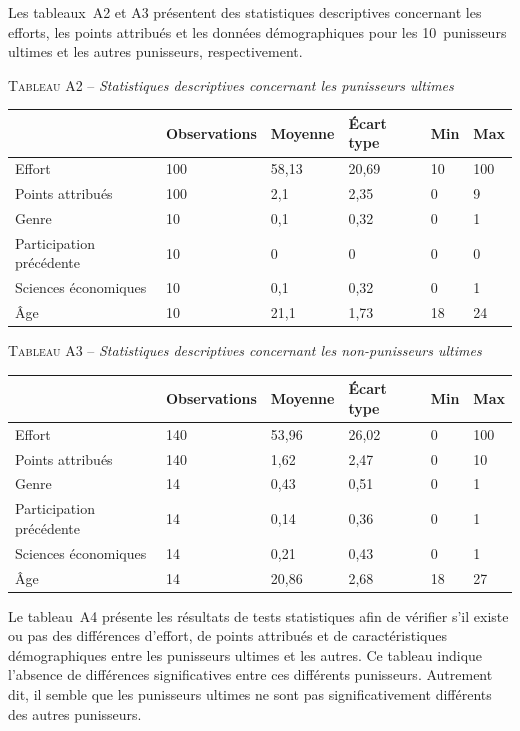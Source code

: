 \begin{Article}
\begin{refsection}[Lebourges]
\begin{appendices}
Les tableaux~A2 et A3 présentent des statistiques descriptives
concernant les efforts, les points attribués et les données
démographiques pour les 10~punisseurs ultimes et les autres punisseurs,
respectivement.

\vspace{0.2cm}
{\centering \textsc{Tableau A2} -- \emph{Statistiques descriptives concernant les punisseurs ultimes}\par}
\begin{table}[h!]
\label{tab_A2}
\centering
\begin{tabular}{p{2.8cm}D{1.2cm}D{1.2cm}D{1.2cm}D{1cm}D{1cm}}
\toprule
& Observations & Moyenne & Écart type & Min & Max \tabularnewline
\midrule
Effort & 100 & 58,13 & 20,69 & 10 & 100 \tabularnewline
Points attribués & 100 & 2,1 & 2,35 & 0 & 9 \tabularnewline
Genre & 10 & 0,1 & 0,32 & 0 & 1 \tabularnewline
Participation précédente & 10 & 0 & 0 & 0 & 0 \tabularnewline
Sciences économiques & 10 & 0,1 & 0,32 & 0 & 1 \tabularnewline
Âge & 10 & 21,1 & 1,73 & 18 & 24 \tabularnewline
\bottomrule
\end{tabular}
\end{table}

\vspace{0.2cm}
{\centering \textsc{Tableau A3} -- \emph{Statistiques descriptives concernant les non-punisseurs ultimes}\par}
\begin{table}[h!]
\label{tab_A3}
\centering
\begin{tabular}{p{2.8cm}D{1.2cm}D{1.2cm}D{1.2cm}D{1cm}D{1cm}}
\toprule
& Observations & Moyenne & Écart type & Min & Max \tabularnewline
\midrule
Effort & 140 & 53,96 & 26,02 & 0 & 100 \tabularnewline
Points attribués & 140 & 1,62 & 2,47 & 0 & 10 \tabularnewline
Genre & 14 & 0,43 & 0,51 & 0 & 1 \tabularnewline
Participation précédente & 14 & 0,14 & 0,36 & 0 & 1 \tabularnewline
Sciences économiques & 14 & 0,21 & 0,43 & 0 & 1 \tabularnewline
Âge & 14 & 20,86 & 2,68 & 18 & 27 \tabularnewline
\bottomrule
\end{tabular}
\end{table}

Le tableau~A4 présente les résultats de tests statistiques afin de
vérifier s'il existe ou pas des différences d'effort, de points
attribués et de caractéristiques démographiques entre les punisseurs
ultimes et les autres. Ce tableau indique l'absence de différences
significatives entre ces différents punisseurs. Autrement dit, il semble
que les punisseurs ultimes ne sont pas significativement différents des
autres punisseurs.


\end{appendices}
\end{refsection}
\end{Article}
